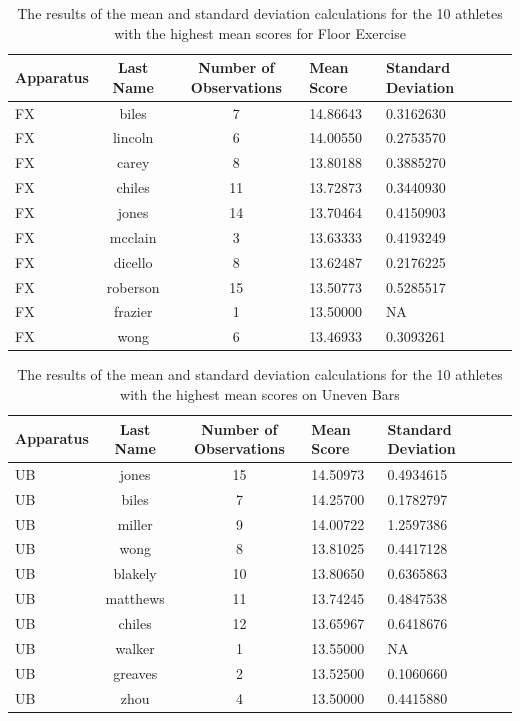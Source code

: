 \documentclass[12pt]{article}
\begin{document}
  \begin{table}[tbp]
    \caption{The results of the mean and standard deviation calculations for the 10 athletes with the highest 
    mean scores for Floor Exercise}
    \label{tab:tableFX}
\centering
\begin{tabular}[t]{lccllll}
   \toprule
  Apparatus & Last Name & Number of Observations & Mean Score & Standard Deviation\\
  \midrule
  FX & biles & 7 & 14.86643 & 0.3162630\\
  \midrule
  FX & lincoln & 6 & 14.00550 & 0.2753570\\
  \midrule
  FX & carey & 8 & 13.80188 & 0.3885270\\
  \midrule
  FX & chiles & 11 & 13.72873 & 0.3440930\\
  \midrule
  FX & jones & 14 & 13.70464 & 0.4150903\\
  \midrule
  FX & mcclain & 3 & 13.63333 & 0.4193249\\
  \midrule
  FX & dicello & 8 & 13.62487 & 0.2176225\\
  \midrule
  FX & roberson & 15 & 13.50773 & 0.5285517\\
  \midrule
  FX & frazier & 1 & 13.50000 & NA\\
  \midrule
  FX & wong & 6 & 13.46933 & 0.3093261\\
  \bottomrule
  \end{tabular}
  \end{table} 

\begin{table}[tbp]
  \caption{The results of the mean and standard deviation calculations for the 10 athletes with the highest 
  mean scores on Uneven Bars}
  \label{tab:tableUB}
\centering
\begin{tabular}[t]{lccllll}
 \toprule
  Apparatus & Last Name & Number of Observations & Mean Score & Standard Deviation\\
  \midrule
  UB & jones & 15 & 14.50973 & 0.4934615\\
  \midrule
  UB & biles & 7 & 14.25700 & 0.1782797\\
  \midrule
  UB & miller & 9 & 14.00722 & 1.2597386\\
  \midrule
  UB & wong & 8 & 13.81025 & 0.4417128\\
  \midrule
  UB & blakely & 10 & 13.80650 & 0.6365863\\
  \midrule
  UB & matthews & 11 & 13.74245 & 0.4847538\\
  \midrule
  UB & chiles & 12 & 13.65967 & 0.6418676\\
  \midrule
  UB & walker & 1 & 13.55000 & NA\\
  \midrule
  UB & greaves & 2 & 13.52500 & 0.1060660\\
  \midrule
  UB & zhou & 4 & 13.50000 & 0.4415880\\
  \bottomrule
  \end{tabular}
  \end{table}
\end{document}
